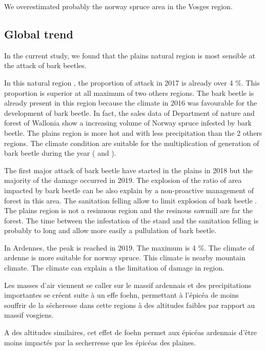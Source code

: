 \documentclass[3p,procedia]{elsarticle}
\begin{document}
We overestimated probably the norway spruce area in the Vosges region.



\subsection{Global trend}
In the current study, we found that the plains natural region is most sensible at the attack of bark beetles.

In this natural region , the proportion of attack in 2017 is already over 4 \%. 
This proportion is superior at all maximum of two others regions. 
The bark beetle is already present in this region because the climate in 2016 was favourable for the development of bark beetle. 
In fact, the sales data of Department of nature and forest of Wallonia show a increasing volume of Norway spruce infested by bark beetle.
The plains region is more hot and with less precipitation than the 2 others regions.
The climate condition are suitable for the multiplication of generation of bark beetle during the year (\citep{baier_phenipscomprehensive_2007} and \citep{annila_influence_1969}).

The first major attack of bark beetle have started in the plains in 2018 but the majority of the damage occurred in 2019. 
The explosion of the ratio of area impacted by bark beetle can be also explain by a non-proactive management of forest in this area. The sanitation felling allow to limit explosion of bark beetle \citep{stadelmann_effects_2013}.
The plains region is not a resinuous region and the resinous sawmill are far the forest. 
The time between the infestation of the stand and the sanitation felling is probably to long and allow more easily a pullulation of bark beetle.

In Ardennes, the peak is reached in 2019. The maximum is 4 \%. The climate of ardenne is more suitable for norway spruce. This climate is nearby mountain climate. 
The climate can explain a the limitation of damage in region. 

Les masses d'air viennent se caller sur le massif ardennais et des precipitations importantes se créent suite à un effe foehn, permettant à l'épicéa de moins souffrir de la sécheresse dans cette regions à des altitudes faibles par rapport au massif vosgiens. 

A des altitudes similaires, cet effet de foehn permet aux épicéas ardennais d'être moins impactés par la secherresse que les épicéas des plaines. 
\end{document}
